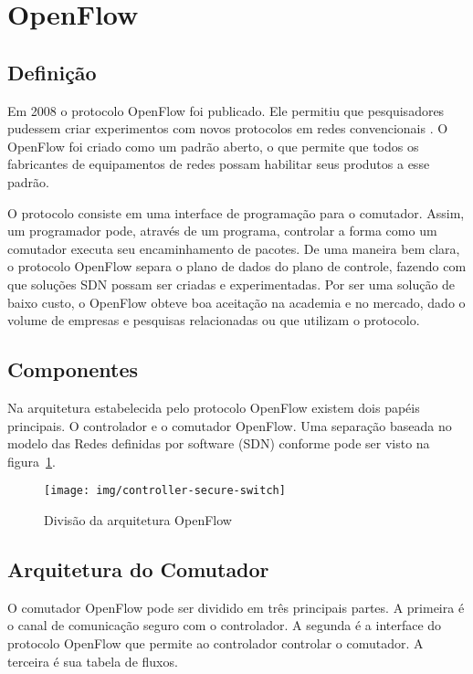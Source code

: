 \section{OpenFlow}



\subsection{Definição}

Em 2008 o protocolo OpenFlow foi publicado. Ele permitiu que pesquisadores
pudessem criar experimentos com novos protocolos em redes convencionais
\citep{nick2008openflow}.
O OpenFlow foi criado como um padrão aberto, o que permite que todos os
fabricantes de equipamentos de redes possam habilitar seus produtos a esse
padrão.

O protocolo consiste em uma interface de programação para o comutador.
Assim, um programador pode, através de um programa, controlar a forma como
um comutador executa seu encaminhamento de pacotes.
De uma maneira bem clara, o protocolo OpenFlow separa o plano de dados
do plano de controle, fazendo com que soluções SDN possam ser criadas
e experimentadas.
Por ser uma solução de baixo custo, o OpenFlow obteve boa aceitação na
academia e no mercado, dado o volume de empresas e pesquisas relacionadas
ou que utilizam o protocolo.

\subsection{Componentes}

Na arquitetura estabelecida pelo protocolo OpenFlow existem dois papéis
principais.
O controlador e o comutador OpenFlow.
Uma separação baseada no modelo das Redes definidas por software (SDN)
conforme pode ser visto na figura~\ref{fig:controller-secure-switch}.

\begin{figure}[h!]
    \centering
    \label{fig:controller-secure-switch}
    \texttt{[image: img/controller-secure-switch]}
    \caption{Divisão da arquitetura OpenFlow}
\end{figure}

\subsection{Arquitetura do Comutador}

O comutador OpenFlow pode ser dividido em três principais partes.
A primeira é o canal de comunicação seguro com o controlador.
A segunda é a interface do protocolo OpenFlow que permite ao controlador
controlar o comutador.
A terceira é sua tabela de fluxos.

